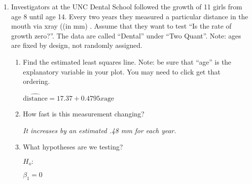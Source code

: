 \begin{enumerate}

\item Investigators at the UNC Dental School followed the growth of 11
  girls from age 8 until age 14.  Every two years they measured a
  particular distance in the mouth via xray ((in mm) .  Assume that
  they want to test ``Is the rate of growth zero?''.  The data are
  called ``Dental'' under ``Two Quant''.  Note: ages are fixed by
  design, not randomly assigned.
     \begin{enumerate}
     \item Find the estimated least squares line.  Note: be sure that
       ``age'' is the explanatory variable in your plot. You may need
       to click  get that ordering.
\begin{students}
  \vspace{1.5cm}
\end{students} 

\begin{key}
  {\it $\widehat{\mbox{distance}} = 17.37 + 0.4795 x \mbox{age}$}
\end{key}

     \item How fast is this measurement changing?
\begin{students}
  \vspace{1.5cm}
\end{students} 

\begin{key}
  {\it It increases by an estimated .48 mm for each year.}
\end{key}

     \item What hypotheses are we testing?

  $H_o:$
\begin{students}
 \vspace{1cm}      
\end{students}
\begin{key}
  {\it  $\beta_1 = 0$   }
\end{key}


\end{enumerate}
\end{enumerate}
